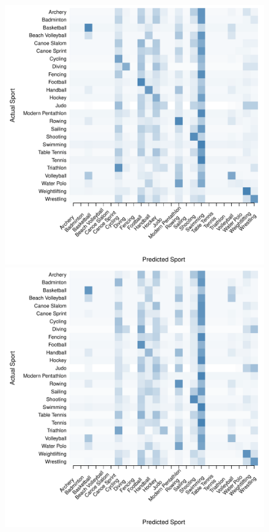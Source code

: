 \begin{figure}
\begin{center}
  \begin{minipage}{0.20\textwidth}
    \begin{center}
      \includegraphics[scale=0.20]{../graphics/sportEV-trn.pdf}
    \end{center}
  \end{minipage}
  \hspace{0.05\textwidth}
  \begin{minipage}{0.20\textwidth}
    \begin{center}
      \includegraphics[scale=0.20]{../graphics/sportEV-tst.pdf}

\end{center}
\end{minipage}
\end{center}
\end{figure}
